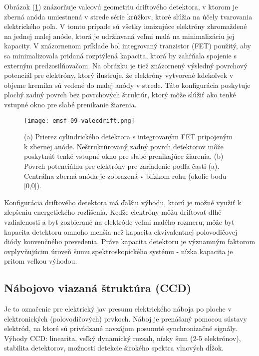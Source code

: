 \documentclass[../../main.tex]{subfiles}
\begin{document}
Obrázok (\ref{em9:fig:valecdrift}) znázorňuje valcovú geometriu driftového detektora, v ktorom je zberná anóda umiestnená v strede série krúžkov, ktoré slúžia na účely tvarovania elektrického poľa. V tomto prípade sú všetky ionizujúce elektróny zhromaždené na jednej malej anóde, ktorá je udržiavaná veľmi malá na minimalizáciu jej kapacity. V znázornenom príklade bol integrovaný tranzistor (FET) použitý, aby sa minimalizovala pridaná rozptýlená kapacita, ktorá by zahŕňala spojenie s externým predzosilňovačom. Na obrázku je tiež znázornený výsledný povrchový potenciál pre elektróny, ktorý ilustruje, že elektróny vytvorené kdekoľvek v objeme kremíka sú vedené do malej anódy v strede. Táto konfigurácia poskytuje plochý zadný povrch bez povrchových štruktúr, ktorý môže slúžiť ako tenké vstupné okno pre slabé prenikanie žiarenia.

\begin{figure}[!h]
\texttt{[image: emsf-09-valecdrift.png]}
\centering
\caption{(a) Prierez cylindrického detektora s integrovaným FET pripojeným k zbernej anóde. Neštruktúrovaný zadný povrch detektorov môže poskytnúť tenké vstupné okno pre slabé prenikajúce žiarenia. (b) Povrch potenciálnu pre elektróny pre zariadenie podľa časti (a). Centrálna zberná anóda je zobrazená v blízkom rohu (okolie bodu [0,0]).}
\label{em9:fig:valecdrift}
\end{figure}

Konfigurácia driftového detektora má ďalšiu výhodu, ktorú je možné využiť k zlepšeniu energetického rozlíšenia. Keďže elektróny môžu driftovať dlhé vzdialenosti a byť zozbierané na elektróde veľmi malého rozmeru, môže byť kapacita detektoru omnoho menšia než kapacita ekvivalentnej polovodičovej diódy konvenčného prevedenia. Práve kapacita detektoru je významným faktorom ovplyvňujúcim úroveň šumu spektroskopického systému - nízka kapacita je pritom veľkou výhodou.

\subsection{Nábojovo viazaná štruktúra (CCD)}
Je to označenie pre elektrický jav presunu elektrického náboja po ploche v elektronických (polovodičových) prvkoch. Náboj je prenášaný pomocou sústavy elektród, na ktoré sú privádzané navzájom posunuté synchronizačné signály. Výhody CCD: linearita, veľký dynamický rozsah, nízky šum (2-5 elektrónov), stabilita detektorov, možnosti detekcie širokého spektra vlnových dĺžok. 
\end{document}
